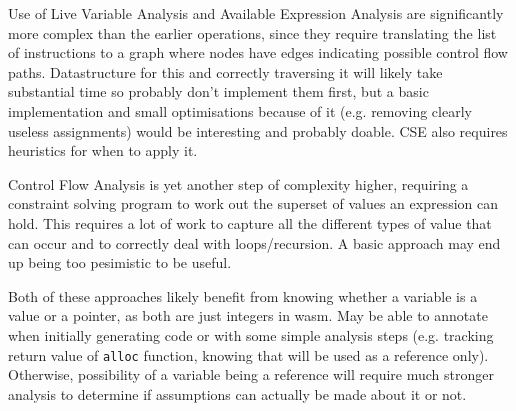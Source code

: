\documentclass[10pt,twoside,a4paper]{article}
\begin{document}
Use of Live Variable Analysis and Available Expression Analysis are significantly more complex than the earlier operations, since they require translating the list of instructions to a graph where nodes have edges indicating possible control flow paths. Datastructure for this and correctly traversing it will likely take substantial time so probably don't implement them first, but a basic implementation and small optimisations because of it (e.g. removing clearly useless assignments) would be interesting and probably doable. CSE also requires heuristics for when to apply it.

Control Flow Analysis is yet another step of complexity higher, requiring a constraint solving program to work out the superset of values an expression can hold. This requires a lot of work to capture all the different types of value that can occur and to correctly deal with loops/recursion. A basic approach may end up being too pesimistic to be useful.

Both of these approaches likely benefit from knowing whether a variable is a value or a pointer, as both are just integers in wasm. May be able to annotate when initially generating code or with some simple analysis steps (e.g. tracking return value of \verb|alloc| function, knowing that will be used as a reference only). Otherwise, possibility of a variable being a reference will require much stronger analysis to determine if assumptions can actually be made about it or not.
\end{document}
